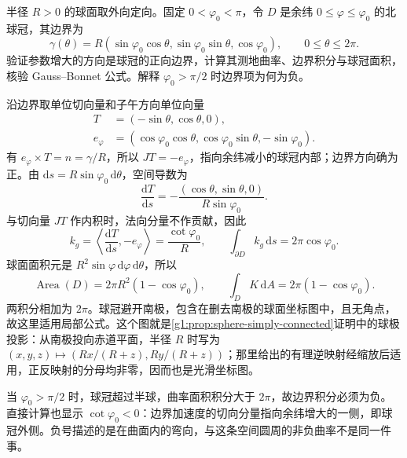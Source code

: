 \begin{exercise}
	\label{g1:ex:spherical-cap-boundary}
	半径 \(R>0\) 的球面取外向定向。固定 \(0<\varphi_0<\pi\)，令 \(D\) 是余纬 \(0\leq\varphi\leq\varphi_0\) 的北球冠，其边界为
	\[
		\gamma(\theta)=R(\sin\varphi_0\cos\theta,\sin\varphi_0\sin\theta,\cos\varphi_0),
		\qquad 0\leq\theta\leq2\pi.
	\]
	验证参数增大的方向是球冠的正向边界，计算其测地曲率、边界积分与球冠面积，核验 Gauss–Bonnet 公式。解释 \(\varphi_0>\pi/2\) 时边界项为何为负。
\end{exercise}
\begin{solution}
	沿边界取单位切向量和子午方向单位向量
	\begin{align*}
		T&=(-\sin\theta,\cos\theta,0),\\
		e_\varphi&=(\cos\varphi_0\cos\theta,\cos\varphi_0\sin\theta,-\sin\varphi_0).
	\end{align*}
	有 \(e_\varphi\times T=n=\gamma/R\)，所以 \(JT=-e_\varphi\)，指向余纬减小的球冠内部；边界方向确为正。由 \(\mathrm{d}s=R\sin\varphi_0\,\mathrm{d}\theta\)，空间导数为
	\[
		\frac{\mathrm{d}T}{\mathrm{d}s}
		=-\frac{(\cos\theta,\sin\theta,0)}{R\sin\varphi_0}.
	\]
	与切向量 \(JT\) 作内积时，法向分量不作贡献，因此
	\[
		k_g=\left\langle\frac{\mathrm{d}T}{\mathrm{d}s},-e_\varphi\right\rangle
		=\frac{\cot\varphi_0}{R},\qquad
		\int_{\partial D}k_g\,\mathrm{d}s=2\pi\cos\varphi_0.
	\]
	球面面积元是 \(R^2\sin\varphi\,\mathrm{d}\varphi\,\mathrm{d}\theta\)，所以
	\[
		\operatorname{Area}(D)=2\pi R^2(1-\cos\varphi_0),\qquad
		\int_DK\,\mathrm{d}A=2\pi(1-\cos\varphi_0).
	\]
	两积分相加为 \(2\pi\)。球冠避开南极，包含在删去南极的球面坐标图中，且无角点，故这里适用局部公式。这个图就是\cref{g1:prop:sphere-simply-connected}证明中的球极投影：从南极投向赤道平面，半径 \(R\) 时写为 \((x,y,z)\mapsto(Rx/(R+z),Ry/(R+z))\)；那里给出的有理逆映射经缩放后适用，正反映射的分母均非零，因而也是光滑坐标图。

	当 \(\varphi_0>\pi/2\) 时，球冠超过半球，曲率面积积分大于 \(2\pi\)，故边界积分必须为负。直接计算也显示 \(\cot\varphi_0<0\)：边界加速度的切向分量指向余纬增大的一侧，即球冠外侧。负号描述的是在曲面内的弯向，与这条空间圆周的非负曲率不是同一件事。
\end{solution}

